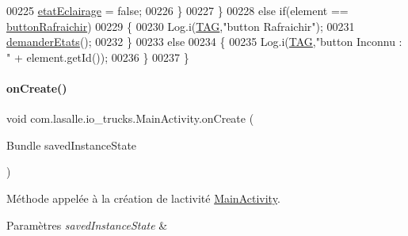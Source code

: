 \begin{DoxyCode}
00225                 \hyperlink{classcom_1_1lasalle_1_1io__trucks_1_1_main_activity_a345177f9fe1d73a402a57ce992a5aa1a}{etatEclairage} = \textcolor{keyword}{false};
00226             \}
00227         \}
00228         \textcolor{keywordflow}{else} \textcolor{keywordflow}{if}(element == \hyperlink{classcom_1_1lasalle_1_1io__trucks_1_1_main_activity_ac138932ce8d8dd12d7eb35496a1c9a16}{buttonRafraichir})
00229         \{
00230             Log.i(\hyperlink{classcom_1_1lasalle_1_1io__trucks_1_1_main_activity_a37b90dba972711328e3f4c83c55eb0fc}{TAG},\textcolor{stringliteral}{"button Rafraichir"});
00231             \hyperlink{classcom_1_1lasalle_1_1io__trucks_1_1_main_activity_aa9cd705ec555f1a41d39172ad2e9fb61}{demanderEtats}();
00232         \}
00233         \textcolor{keywordflow}{else}
00234         \{
00235             Log.i(\hyperlink{classcom_1_1lasalle_1_1io__trucks_1_1_main_activity_a37b90dba972711328e3f4c83c55eb0fc}{TAG},\textcolor{stringliteral}{"button Inconnu : "} + element.getId());
00236         \}
00237     \}
\end{DoxyCode}
\mbox{\label{classcom_1_1lasalle_1_1io__trucks_1_1_main_activity_a236d8585ed546ef42c0d2dfd3268893a}} 
\paragraph{\texorpdfstring{on\+Create()}{onCreate()}}
{\footnotesize\ttfamily void com.\+lasalle.\+io\+\_\+trucks.\+Main\+Activity.\+on\+Create (\begin{DoxyParamCaption}\item[{Bundle}]{saved\+Instance\+State }\end{DoxyParamCaption})\hspace{0.3cm}{\ttfamily [protected]}}



Méthode appelée à la création de l\textquotesingle{}activité \hyperlink{classcom_1_1lasalle_1_1io__trucks_1_1_main_activity}{Main\+Activity}. 


\begin{DoxyParams}{Paramètres}
{\em saved\+Instance\+State} & \\
\hline
\end{DoxyParams}


